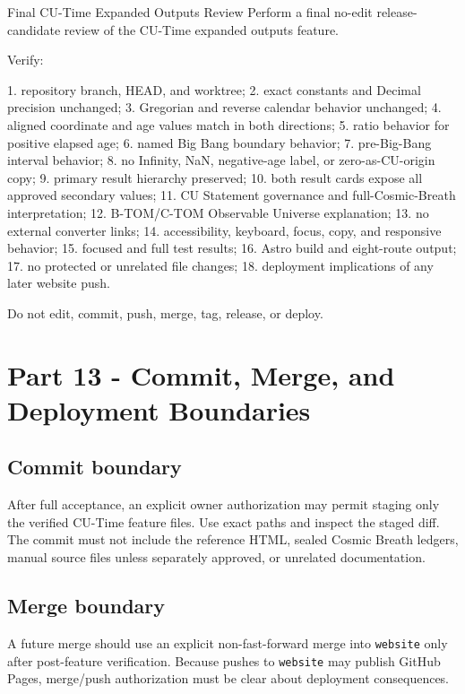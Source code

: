 \documentclass[11pt,letterpaper]{article}
\newcommand{\branchname}[1]{\texttt{#1}}
\begin{document}
\begin{promptbox}{Final CU-Time Expanded Outputs Review}
Perform a final no-edit release-candidate review of the CU-Time expanded
outputs feature.

Verify:

1. repository branch, HEAD, and worktree;
2. exact constants and Decimal precision unchanged;
3. Gregorian and reverse calendar behavior unchanged;
4. aligned coordinate and age values match in both directions;
5. ratio behavior for positive elapsed age;
6. named Big Bang boundary behavior;
7. pre-Big-Bang interval behavior;
8. no Infinity, NaN, negative-age label, or zero-as-CU-origin copy;
9. primary result hierarchy preserved;
10. both result cards expose all approved secondary values;
11. CU Statement governance and full-Cosmic-Breath interpretation;
12. B-TOM/C-TOM Observable Universe explanation;
13. no external converter links;
14. accessibility, keyboard, focus, copy, and responsive behavior;
15. focused and full test results;
16. Astro build and eight-route output;
17. no protected or unrelated file changes;
18. deployment implications of any later website push.

Do not edit, commit, push, merge, tag, release, or deploy.
\end{promptbox}

\section{Part 13 - Commit, Merge, and Deployment Boundaries}

\subsection{Commit boundary}

After full acceptance, an explicit owner authorization may permit staging only
the verified CU-Time feature files. Use exact paths and inspect the staged diff.
The commit must not include the reference HTML, sealed Cosmic Breath ledgers,
manual source files unless separately approved, or unrelated documentation.

\subsection{Merge boundary}

A future merge should use an explicit non-fast-forward merge into
\branchname{website} only after post-feature verification. Because pushes to
\branchname{website} may publish GitHub Pages, merge/push authorization must be
clear about deployment consequences.
\end{document}

